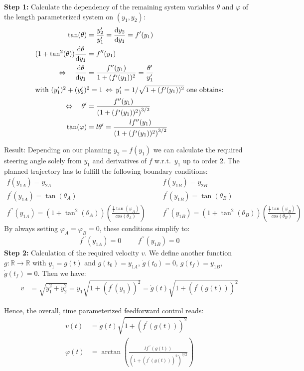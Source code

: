 \documentclass[a4paper,11pt,headings=standardclasses,parskip=half]{scrartcl}
\newcommand{\yIZ}{y_{1A}}
\newcommand{\yIIZ}{y_{2A}}
\newcommand{\yIT}{y_{1B}}
\newcommand{\yIIT}{y_{2B}}
\newcommand{\diff}[2]{\frac{\text{d}#1}{\text{d}#2}}
\begin{document}
\textbf{Step 1:} Calculate the dependency of the remaining system variables $\theta$ and $\varphi$ of the  length parameterized system on $(y_1, y_2)$:
\begin{align}
\tan(\theta) &= \frac{y_2^\prime}{y_1^\prime} = \diff{y_2}{y_1} = f^\prime(y_1)\\
(1 + \tan^2(\theta))\diff{\theta}{y_1} &= f^{\prime\prime}(y_1) \nonumber \\
\Leftrightarrow \quad \diff{\theta}{y_1}&= \frac{f^{\prime\prime}(y_1)}{1 + (f^\prime(y_1))^2} = \frac{\theta^\prime}{y_1^\prime} \nonumber\\
\intertext{with $(y_1^\prime)^2 + (y_2^\prime)^2 = 1 \, \Leftrightarrow \, y_1^\prime = 1/\sqrt{1 + (f^\prime(y_1))^2}$ one obtains:}
\Leftrightarrow \quad \theta^\prime &= \frac{f^{\prime\prime}(y_1)}{\left(1 + (f^\prime(y_1))^2\right)^{3/2}}\\
\tan(\varphi) &= l\theta^\prime = \frac{lf^{\prime\prime}(y_1)}{\left(1 + (f^\prime(y_1))^2\right)^{3/2}}
\end{align}

Result: Depending on our planning $y_2 = f(y_1)$ we can calculate the required steering angle solely from $y_1$ and derivatives of $f$ w.r.t.~$y_1$ up to order 2. The planned trajectory has to fulfill the following boundary conditions:
\begin{align*}
f(\yIZ) = \yIIZ &&& f(\yIT) = \yIIT \\
f^\prime(\yIZ) = \tan(\theta_A) &&& f^\prime(\yIT) = \tan(\theta_B) \\
f^{\prime\prime}(\yIZ) = (1+\tan^2(\theta_A))\left(\frac{\frac{1}{l}\tan(\varphi_A)}{cos(\theta_A)}\right) &&& 
f^{\prime\prime}(\yIT) = (1+\tan^2(\theta_B))\left(\frac{\frac{1}{l}\tan(\varphi_B)}{cos(\theta_B)}\right) 
\end{align*}
By always setting $\varphi_A=\varphi_B=0$, these conditions simplify to:
\begin{align*}
f^{\prime\prime}(\yIZ) = 0 &&& f^{\prime\prime}(\yIT) = 0
\end{align*}
\textbf{Step 2:} Calculation of the required velocity $v$. We define another function $g: \mathbb{R} \to \mathbb{R}$ with $y_1 = g(t)$ and $g(t_0) = \yIZ$, $\dot g(t_0) = 0$, $g(t_f) = \yIT$, $\dot g(t_f) = 0$. Then we have:
\begin{align}
v &= \sqrt{\dot y_1^2 + \dot y_2^2} = \dot y_1\sqrt{1 + (f^\prime(y_1))^2} = \dot g(t) \sqrt{1 + (f^\prime(g(t)))^2}
\end{align}

Hence, the overall, time parameterized feedforward control reads:
\begin{subequations}
\begin{align}
v(t) &= \dot g(t) \sqrt{1 + (f^\prime(g(t)))^2}\\
\varphi(t) &= \arctan\left(\frac{lf^{\prime\prime}(g(t))}{\left(1 + (f^\prime(g(t)))^2\right)^{3/2}}\right)
\end{align}
\end{subequations}
\end{document}
